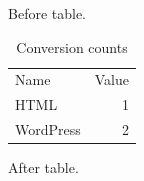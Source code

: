 Before table.

\begin{table}
\caption{Conversion counts}
\begin{tabular}{lr}
Name & Value \\
HTML & 1 \\
WordPress & 2 \\
\end{tabular}
\end{table}

After table.